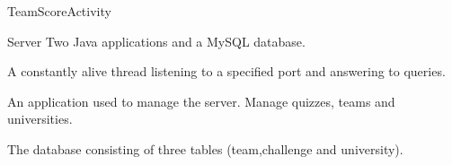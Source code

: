 \documentclass{beamer}
\newlength{\wideitemsep}
\let\olditem\item
\renewcommand{\item}{\setlength{\itemsep}{\wideitemsep}\olditem}
\begin{document}
\begin{frame}{TeamScoreActivity}
    \begin{center}
        \hspace{2cm}
    \end{center}
\end{frame}

\begin{frame}{Server}
    Two Java applications and a MySQL database.
    \vspace{0.5cm}
    \begin{description}
    \pause \item[\bf Query Handler Process] A constantly alive thread listening to a specified port and answering to queries.
    \pause \item[\bf Server Manager] An application used to manage the server. Manage quizzes, teams and universities.
    \pause \item[\bf unicontest] The database consisting of three tables (team,challenge and university).
    \end{description}
\end{frame}
\end{document}
